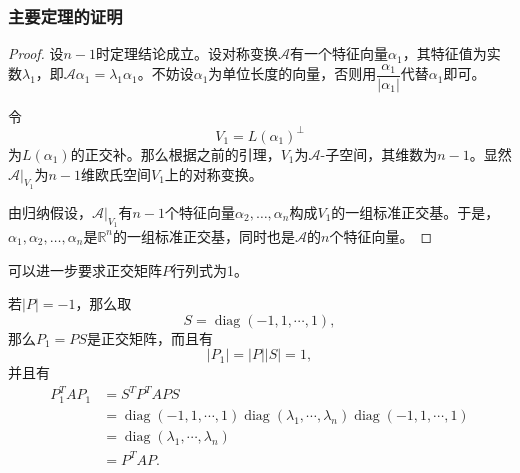 \begin{frame}
\frametitle{主要定理的证明}

\begin{proof}
\phantom{一一}设$n-1$时定理结论成立。设对称变换$\mathscr{A}$有一个特征向量$\alpha_1$，其特征值为实数$\lambda_1$，即$\mathscr{A}\alpha_1 = \lambda_1\alpha_1$。不妨设$\alpha_1$为单位长度的向量，否则用$\displaystyle \dfrac{\alpha_1}{\lvert \alpha_1 \rvert}$代替$\alpha_1$即可。

\vspace{0.6em}
\pause

\phantom{一一}令
$$V_1 = L(\alpha_1)^\perp$$
为$L(\alpha_1)$的正交补。那么根据之前的引理，$V_1$为$\mathscr{A}$-子空间，其维数为$n-1$。显然$\mathscr{A}|_{V_1}$为$n-1$维欧氏空间$V_1$上的对称变换。

\vspace{0.6em}
\pause

\phantom{一一}由归纳假设，$\mathscr{A}|_{V_1}$有$n-1$个特征向量$\alpha_2,\ldots,\alpha_n$构成$V_1$的一组标准正交基。于是，$\alpha_1,\alpha_2,\ldots,\alpha_n$是$\mathbb{R}^n$的一组标准正交基，同时也是$\mathscr{A}$的$n$个特征向量。
\end{proof}

\end{frame}


\begin{frame}

\begin{remark}
可以进一步要求正交矩阵$P$行列式为1。

\pause

若$\lvert P \rvert = -1$，那么取
$$S = \operatorname{diag}(-1,1,\cdots,1),$$
那么$P_1 = PS$是正交矩阵，而且有
$$\lvert P_1 \rvert = \lvert P \rvert \lvert S \rvert = 1,$$
并且有
\begin{align*}
P_1^TAP_1 & = S^T P^T A P S \\
& = \operatorname{diag}(-1,1,\cdots,1)\operatorname{diag}(\lambda_1,\cdots,\lambda_n)\operatorname{diag}(-1,1,\cdots,1) \\
& = \operatorname{diag}(\lambda_1,\cdots,\lambda_n) \\
& = P^TAP.
\end{align*}
\end{remark}

\end{frame}


